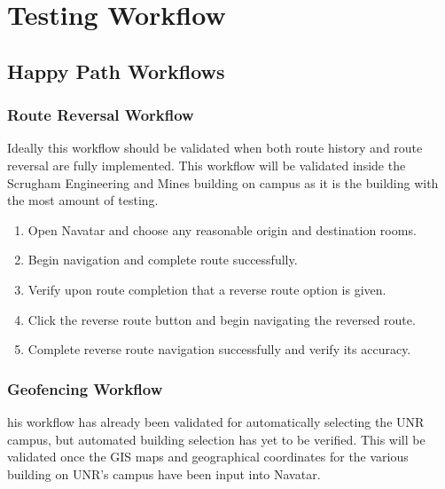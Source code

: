 \documentclass{scrreprt}
\begin{document}
\pagebreak

\chapter{Testing Workflow}

\section{Happy Path Workflows}

\subsection{Route Reversal Workflow}

Ideally this workflow should be validated when both route history and route reversal are fully implemented. This workflow will be validated inside the Scrugham Engineering and Mines building on campus as it is the building with the most amount of testing.

\begin{enumerate}
	\item Open Navatar and choose any reasonable origin and destination rooms.
	
	\item Begin navigation and complete route successfully.
	
	\item Verify upon route completion that a reverse route option is given.
	
	\item Click the reverse route button and begin navigating the reversed route.
	
	\item Complete reverse route navigation successfully and verify its accuracy.

\end{enumerate}

\subsection{Geofencing Workflow}

his workflow has already been validated for automatically selecting the UNR campus, but automated building selection has yet to be verified. This will be validated once the GIS maps and geographical coordinates for the various building on UNR’s campus have been input into Navatar.
\end{document}
